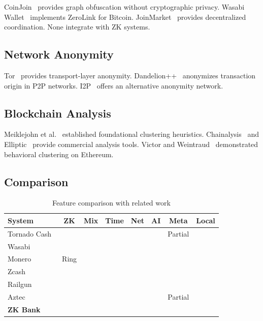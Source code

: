 \documentclass[11pt]{article}
\newcommand{\cmark}{\ding{51}}
\newcommand{\xmark}{\ding{55}}
\theoremstyle{definition}
\theoremstyle{plain}
\theoremstyle{remark}
\begin{document}
CoinJoin~\cite{maxwell2013coinjoin} provides graph obfuscation without cryptographic privacy. Wasabi Wallet~\cite{nopara2018wasabi} implements ZeroLink for Bitcoin. JoinMarket~\cite{joinmarket2015} provides decentralized coordination. None integrate with ZK systems.

\subsection{Network Anonymity}

Tor~\cite{dingledine2004tor} provides transport-layer anonymity. Dandelion++~\cite{venkatakrishnan2017dandelion} anonymizes transaction origin in P2P networks. I2P~\cite{i2p2003} offers an alternative anonymity network.

\subsection{Blockchain Analysis}

Meiklejohn et al.~\cite{meiklejohn2013fistful} established foundational clustering heuristics. Chainalysis~\cite{chainalysis2023} and Elliptic~\cite{elliptic2023} provide commercial analysis tools. Victor and Weintraud~\cite{victor2020address} demonstrated behavioral clustering on Ethereum.

\subsection{Comparison}

\begin{table}[H]
\centering
\caption{Feature comparison with related work}
\label{tab:related}
\begin{tabular}{lccccccc}
\toprule
\textbf{System} & \textbf{ZK} & \textbf{Mix} & \textbf{Time} & \textbf{Net} & \textbf{AI} & \textbf{Meta} & \textbf{Local} \\
\midrule
Tornado Cash~\cite{pertsev2019tornado} & \cmark & \xmark & \xmark & \xmark & \xmark & Partial & \xmark \\
Wasabi~\cite{nopara2018wasabi} & \xmark & \cmark & \xmark & \cmark & \xmark & \xmark & \xmark \\
Monero~\cite{vansaberhagen2013cryptonote} & Ring & \cmark & \xmark & \xmark & \xmark & \cmark & \xmark \\
Zcash~\cite{hopwood2016zcash} & \cmark & \xmark & \xmark & \xmark & \xmark & \xmark & \xmark \\
Railgun~\cite{railgun2021} & \cmark & \xmark & \xmark & \xmark & \xmark & \xmark & \xmark \\
Aztec~\cite{aztec2023} & \cmark & \xmark & \xmark & \xmark & \xmark & Partial & \xmark \\
\textbf{ZK Bank} & \cmark & \cmark & \cmark & \cmark & \cmark & \cmark & \cmark \\
\bottomrule
\end{tabular}
\end{table}
\end{document}
